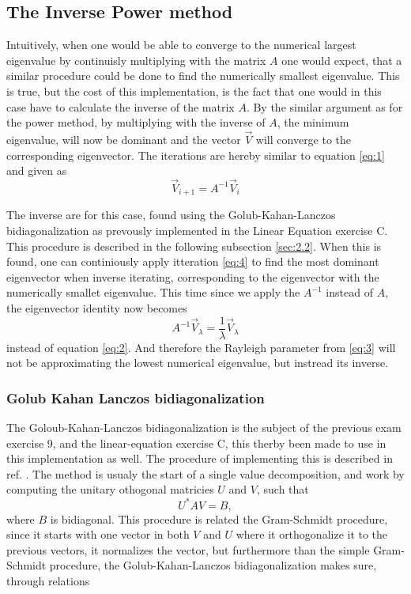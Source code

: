\documentclass[twocolumn]{article}
\begin{document}
\subsection{\label{sec:2}The Inverse Power method}
Intuitively, when one would be able to converge to the numerical largest eigenvalue by continuisly multiplying with the matrix $A$ one would expect, that a similar procedure could be done to find the numerically smallest eigenvalue. This is true, but the cost of this implementation, is the fact that one would in this case have to calculate the inverse of the matrix $A$. By the similar argument as for the power method, by multiplying with the inverse of $A$, the minimum eigenvalue, will now be dominant and the vector $\vec{V}$ will converge to the corresponding eigenvector. The iterations are hereby similar to equation \eqref{eq:1} and given as
\begin{equation}
\vec{V}_{i+1} = A^{-1} \vec{V}_i \label{eq:4}
\end{equation}

The inverse are for this case, found using the Golub-Kahan-Lanczos bidiagonalization as prevously implemented in the Linear Equation exercise C. This procedure is described in the following subsection \ref{sec:2.2}. When this is found, one can continiously apply itteration \ref{eq:4} to find the most dominant eigenvector when inverse iterating, corresponding to the eigenvector with the numerically smallet eigenvalue. This time since we apply the $A^{-1}$ instead of $A$, the eigenvector identity now becomes
\begin{equation}
 A^{-1} \vec{V}_\lambda = \frac{1}{\lambda} \vec{V}_\lambda \label{eq:5}
\end{equation}
instead of equation \eqref{eq:2}. And therefore the Rayleigh parameter from \eqref{eq:3} will not be approximating the lowest numerical eigenvalue, but instread its inverse. 
\subsubsection{\label{sec:2.2} Golub Kahan Lanczos bidiagonalization}
The Goloub-Kahan-Lanczos bidiagonalization is the subject of the previous exam exercise 9, and the linear-equation exercise C, this therby been made to use in this implementation as well. The procedure of implementing this is described in ref. \cite{BKL}. The method is usualy the start of a single value decomposition, and work by computing the unitary othogonal matricies $U$ and $V$, such that 
\begin{equation}
U^\ast A V = B,
\end{equation}
where $B$ is bidiagonal. This procedure is related the Gram-Schmidt procedure, since it starts with one vector in both $V$ and $U$ where it orthogonalize it to the previous vectors, it normalizes the vector, but furthermore than the simple Gram-Schmidt procedure, the Golub-Kahan-Lanczos bidiagonalization makes sure, through relations
\end{document}
